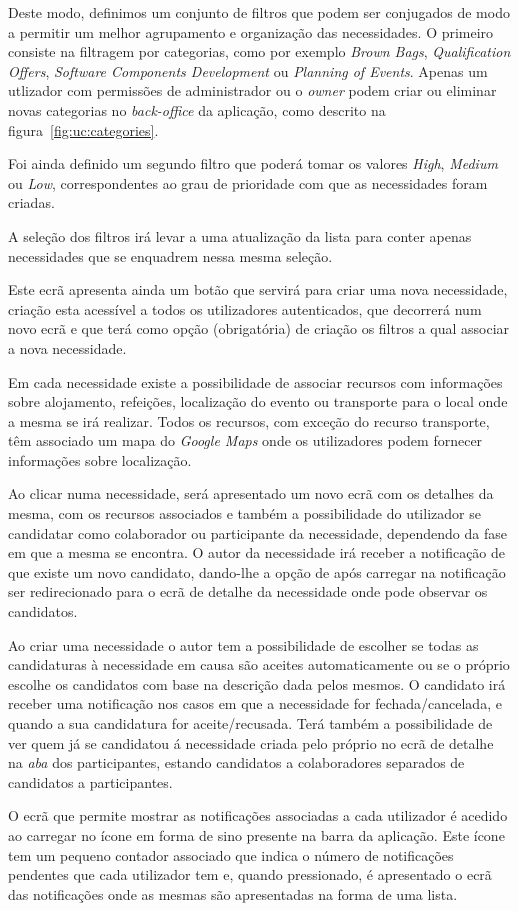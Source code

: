 Deste modo, definimos um conjunto de filtros que podem ser conjugados de modo a permitir um melhor agrupamento e organização das necessidades. 
O primeiro consiste na filtragem por categorias, como por exemplo \textit{Brown Bags}, 
\textit{Qualification Offers}, \textit{Software Components Development} ou \textit{Planning of Events}. 
Apenas um utlizador com permissões de administrador ou o \textit{owner} podem criar ou eliminar novas categorias no \textit{back-office} da aplicação, como descrito na figura~\ref{fig:uc:categories}.
\par
Foi ainda definido um segundo filtro que poderá tomar os valores \textit{High}, \textit{Medium} ou \textit{Low}, 
correspondentes ao grau de prioridade com que as necessidades foram criadas. 
\par
A seleção dos filtros irá levar a uma atualização da lista para conter apenas necessidades que se enquadrem nessa mesma seleção. 
\par
Este ecrã apresenta ainda um botão que servirá para criar uma nova necessidade, criação esta acessível a todos os utilizadores autenticados, 
que decorrerá num novo ecrã e que terá como opção (obrigatória) de criação os filtros a qual associar a nova necessidade. 
\par
Em cada necessidade existe a possibilidade de associar recursos com informações sobre alojamento, refeições, localização do evento ou transporte para o local onde a mesma se irá realizar. Todos os recursos, com exceção do recurso transporte, têm associado um mapa do \textit{Google Maps} onde os utilizadores podem fornecer informações sobre localização.
\par
Ao clicar numa necessidade, será apresentado um novo ecrã com os detalhes da mesma, com os recursos associados e também a possibilidade do utilizador se candidatar como colaborador ou participante da necessidade, dependendo da fase em que a mesma se encontra. O autor da necessidade irá receber a notificação de que existe um novo candidato, 
dando-lhe a opção de após carregar na notificação ser redirecionado para o ecrã de detalhe da necessidade onde pode observar os candidatos. 

\par
Ao criar uma necessidade o autor tem a possibilidade de escolher se todas as candidaturas à necessidade em causa são aceites automaticamente ou se o próprio escolhe os candidatos com base na descrição dada pelos mesmos.  
O candidato irá receber uma notificação nos casos em que a necessidade for fechada/cancelada, e quando a sua candidatura for aceite/recusada. 
Terá também a possibilidade de ver quem já se candidatou á necessidade criada pelo próprio no ecrã de detalhe na \textit{aba} dos participantes, estando candidatos a colaboradores separados de candidatos a participantes. 
\par
O ecrã que permite mostrar as notificações associadas a cada utilizador é acedido ao carregar no ícone em forma de sino presente na barra da aplicação. Este ícone tem um pequeno contador associado que indica o número de notificações pendentes que cada utilizador tem e, quando pressionado, é apresentado o ecrã das notificações onde as mesmas são apresentadas na forma de uma lista. 

